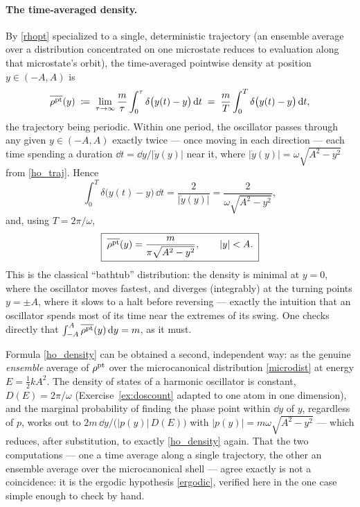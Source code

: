 \paragraph{The time-averaged density.} By \eqref{rhopt} specialized to a single, deterministic trajectory (an ensemble average over a distribution concentrated on one microstate reduces to evaluation along that microstate's orbit), the time-averaged pointwise density at position $y\in(-A,A)$ is
\begin{equation}\label{ho_timeavg}
	\overline{\rho^{\rm pt}}(y) \;\coloneqq\; \lim_{\tau\to\infty}\frac{m}{\tau}\int_0^\tau \delta\big(y(t)-y\big)\,\mathrm{d} t \;=\; \frac{m}{T}\int_0^T \delta\big(y(t)-y\big)\,\mathrm{d} t,
\end{equation}
the trajectory being periodic. Within one period, the oscillator passes through any given $y\in(-A,A)$ exactly twice --- once moving in each direction --- each time spending a duration $\dd t = \dd y/|\dot y(y)|$ near it, where $|\dot y(y)|=\omega\sqrt{A^2-y^2}$ from \eqref{ho_traj}. Hence
\begin{equation}
	\int_0^T \delta\big(y(t)-y\big)\,\dd t = \frac{2}{|\dot y(y)|} = \frac{2}{\omega\sqrt{A^2-y^2}},
\end{equation}
and, using $T=2\pi/\omega$,
\begin{equation}\label{ho_density}
	\boxed{\;\overline{\rho^{\rm pt}}(y) = \frac{m}{\pi\sqrt{A^2-y^2}}, \qquad |y|<A.\;}
\end{equation}
This is the classical ``bathtub'' distribution: the density is minimal at $y=0$, where the oscillator moves fastest, and diverges (integrably) at the turning points $y=\pm A$, where it slows to a halt before reversing --- exactly the intuition that an oscillator spends most of its time near the extremes of its swing. One checks directly that $\int_{-A}^{A}\overline{\rho^{\rm pt}}(y)\,\mathrm{d} y=m$, as it must.

\begin{remark}
	Formula \eqref{ho_density} can be obtained a second, independent way: as the genuine \textit{ensemble} average of $\rho^{\rm pt}$ over the microcanonical distribution \eqref{microdist} at energy $E=\tfrac12kA^2$. The density of states of a harmonic oscillator is constant, $D(E)=2\pi/\omega$ (Exercise~\ref{ex:doscount} adapted to one atom in one dimension), and the marginal probability of finding the phase point within $\dd y$ of $y$, regardless of $p$, works out to $2m\,\dd y/\big(|p(y)|\,D(E)\big)$ with $|p(y)|=m\omega\sqrt{A^2-y^2}$ --- which reduces, after substitution, to exactly \eqref{ho_density} again. That the two computations --- one a time average along a single trajectory, the other an ensemble average over the microcanonical shell --- agree exactly is not a coincidence: it is the ergodic hypothesis \eqref{ergodic}, verified here in the one case simple enough to check by hand.
\end{remark}


